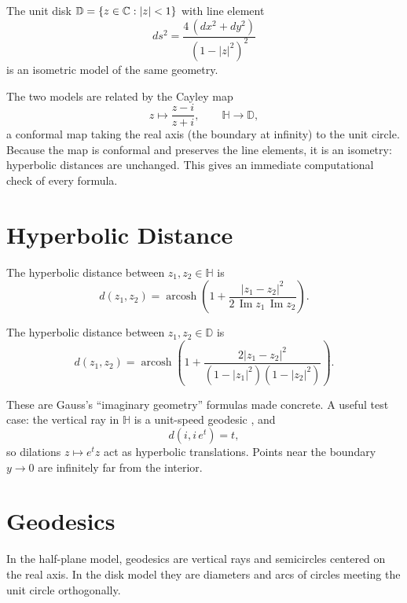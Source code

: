 \begin{definition}
The unit disk $\mathbb{D} = \{z \in \mathbb{C} : \lvert z \rvert < 1\}$ with line element
\[
ds^2 = \frac{4\,(dx^2 + dy^2)}{(1 - \lvert z \rvert^2)^2}
\]
is an isometric model of the same geometry.
\end{definition}

The two models are related by the Cayley map 
\[
z \mapsto \frac{z - i}{z + i}, \qquad \mathbb{H} \to \mathbb{D},
\]
a conformal map taking the real axis (the boundary at infinity) to the unit circle. Because the map is conformal and preserves the line elements, it is an isometry: hyperbolic distances are unchanged. This gives an immediate computational check of every formula.

\section{Hyperbolic Distance}

\begin{theorem}
The hyperbolic distance between $z_1, z_2 \in \mathbb{H}$ is
\[
d(z_1, z_2) = \operatorname{arcosh}\!\left(1 + \frac{\lvert z_1 - z_2 \rvert^2}{2\,\operatorname{Im} z_1\, \operatorname{Im} z_2}\right).
\]
\end{theorem}

\begin{theorem}
The hyperbolic distance between $z_1, z_2 \in \mathbb{D}$ is
\[
d(z_1, z_2) = \operatorname{arcosh}\!\left(1 + \frac{2 \lvert z_1 - z_2 \rvert^2}{(1 - \lvert z_1 \rvert^2)(1 - \lvert z_2 \rvert^2)}\right).
\]
\end{theorem}

These are Gauss's ``imaginary geometry'' formulas made concrete. A useful test case: the vertical ray in $\mathbb{H}$ is a unit-speed geodesic , and
\[
d(i, i\,e^t) = t,
\]
so dilations $z \mapsto e^t z$ act as hyperbolic translations. Points near the boundary $y \to 0$ are infinitely far from the interior.

\section{Geodesics}

In the half-plane model, geodesics are vertical rays and semicircles centered on the real axis. In the disk model they are diameters and arcs of circles meeting the unit circle orthogonally.

